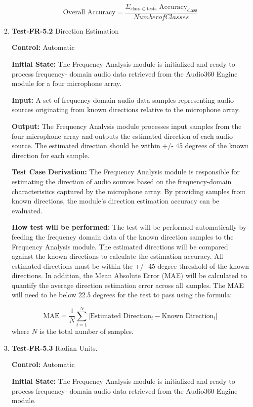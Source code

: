 \documentclass[12pt, titlepage]{article}
\begin{document}
\begin{enumerate}
\[
\text{Overall Accuracy} = \frac{\Sigma_{\text{class } \in \text{  tests}} 
\text{      Accuracy}_{\text{class}}}{Number of Classes}
\]

\item{\textbf{Test-FR-5.2} Direction Estimation\\}

\textbf{Control:} Automatic

\textbf{Initial State:}
The Frequency Analysis module is initialized and ready to process frequency-
domain audio data retrieved from the Audio360 Engine module for a four
microphone array.

\textbf{Input:}
A set of frequency-domain audio data samples representing audio sources
originating from known directions relative to the
microphone array.

\textbf{Output:}
The Frequency Analysis module processes input samples from the four microphone
array and outputs the estimated direction of each audio source. The estimated
direction should be within +/- 45 degrees of the known direction for each sample.

\textbf{Test Case Derivation:}
The Frequency Analysis module is responsible for estimating the direction
of audio sources based on the frequency-domain characteristics captured by
the microphone array. By providing samples from known directions, the module's
direction estimation accuracy can be evaluated.

\textbf{How test will be performed:}
The test will be performed automatically by feeding the frequency
domain data of the known direction samples to the Frequency Analysis module.
The estimated directions will be compared against the known directions to
calculate the estimation accuracy. All estimated directions
must be within the +/- 45 degree threshold of the known directions. In addition,
the Mean Absolute Error (MAE) will be calculated to quantify the average
direction estimation error across all samples. The MAE will need to be below
22.5 degrees for the test to pass using the formula:

\[
\text{MAE} = \frac{1}{N} \sum_{i=1}^{N} | \text{Estimated Direction}_i - \text{Known Direction}_i |
\]
where \(N\) is the total number of samples.

\item{\textbf{Test-FR-5.3} Radian Units.\\}

\textbf{Control:} Automatic

\textbf{Initial State:}
The Frequency Analysis module is initialized and ready to process frequency-
domain audio data retrieved from the Audio360 Engine module.


\end{enumerate}
\end{document}
